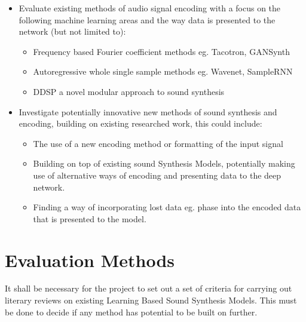 \begin{itemize}
    \item Evaluate existing methods of audio signal encoding with a focus on the
    following machine learning areas and the way data is presented to the network
    (but not limited to):
    \begin{itemize}
        \item Frequency based Fourier coefficient methods eg. Tacotron, GANSynth
        \item Autoregressive whole single sample methods eg. Wavenet, SampleRNN
        \item DDSP a novel modular approach to sound synthesis
    \end{itemize}
    \item Investigate potentially innovative new methods of sound synthesis and
    encoding, building on existing researched work, this could include:
    \begin{itemize}
        \item The use of a new encoding method or formatting of the input signal
        \item Building on top of existing sound Synthesis Models, potentially making
        use of alternative ways of encoding and presenting data to the deep network.
        \item Finding a way of incorporating lost data eg. phase into the encoded
        data that is presented to the model.
    \end{itemize}
\end{itemize}

\section{Evaluation Methods}

It shall be necessary for the project to set out a set of criteria for carrying
out literary reviews on existing Learning Based Sound Synthesis Models. This must
be done to decide if any method has potential to be built on further.

